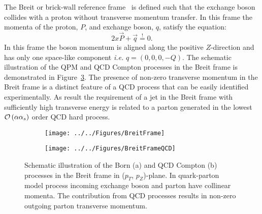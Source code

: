 The Breit or brick-wall reference frame~\cite{feynman:1972:photon,zfp:c2:237} is defined such that the exchange boson collides with a proton without transverse momentum transfer. In this frame the momenta of the proton, $P$, and exchange boson, $q$, satisfy the equation:
\begin{equation}
2x\vec{P} + \vec{q} \stackrel{!}{=} 0.
\label{eq:breitframe}
\end{equation}
In this frame the boson momentum is aligned along the positive $Z$-direction and has only one space-like component \textit{i.e.} $q=\left( 0, 0, 0, -Q\right)$. The schematic illustration of the QPM and QCD Compton processes in the Breit frame is demonstrated in Figure~\ref{fig:breitframe}. The presence of non-zero transverse momentum in the Breit frame is a distinct feature of a QCD process that can be easily identified experimentally. As result the requirement of a jet in the Breit frame with sufficiently high transverse energy is related to a parton generated in the lowest $\mathcal{O}\left(\alpha\mbox{$\alpha_{s}$}\right)$ order QCD hard process.
\begin{figure}
	\centering
	\begin{subfigure}{.49\textwidth}
		\centering
		\texttt{[image: ../../Figures/BreitFrame]}
		\caption{}
		\label{fig:breitframeqpm}
	\end{subfigure}
	\begin{subfigure}{.49\textwidth}
		\texttt{[image: ../../Figures/BreitFrameQCD]}
		\caption{}
		\label{fig:breitframeqcd}
	\end{subfigure}
	\caption{Schematic illustration of the Born (a) and QCD Compton (b) processes in the Breit frame in ($p_T$, $p_Z$)-plane. In quark-parton model process incoming exchange boson and parton have collinear momenta. The contribution from QCD processes results in non-zero outgoing parton transverse momentum.}
\label{fig:breitframe}
\end{figure}
